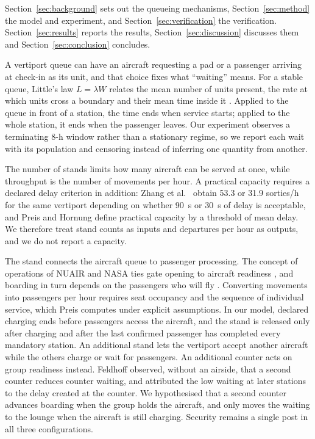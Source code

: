 \documentclass[12pt,a4paper]{article}
\makeatletter
\renewcommand\section{\@startsection{section}{1}{\z@}{12pt}{4pt}{\fontsize{14}{20}\selectfont\bfseries}}
\makeatother
\begin{document}
Section~\ref{sec:background} sets out the queueing mechanisms, Section~\ref{sec:method} the model
and experiment, and Section~\ref{sec:verification} the verification. Section~\ref{sec:results}
reports the results, Section~\ref{sec:discussion} discusses them and Section~\ref{sec:conclusion}
concludes.

\section{Queueing Mechanisms At A Passenger Vertiport}
\label{sec:background}

A vertiport queue can have an aircraft requesting a pad or a passenger arriving at check-in as
its unit, and that choice fixes what ``waiting'' means. For a stable queue, Little's law
$L=\lambda W$ relates the mean number of units present, the rate at which units cross a boundary
and their mean time inside it \cite{little1961}. Applied to the queue in front of a station, the
time ends when service starts; applied to the whole station, it ends when the passenger leaves. Our
experiment observes a terminating 8-h window rather than a stationary regime, so we report each
wait with its population and censoring instead of inferring one quantity from another.

The number of stands limits how many aircraft can be served at once, while throughput is the number
of movements per hour. A practical capacity requires a declared delay criterion in addition: Zhang
et al.\ \cite{zhang2023capacity} obtain 53.3 or 31.9 sorties/h for the same vertiport depending on
whether 90~s or 30~s of delay is acceptable, and Preis and Hornung \cite{preisHornung2022heuristic}
define practical capacity by a threshold of mean delay. We therefore treat stand counts as inputs
and departures per hour as outputs, and we do not report a capacity.

The stand connects the aircraft queue to passenger processing. The concept of operations of NUAIR
and NASA ties gate opening to aircraft readiness \cite{kunchulia2021}, and boarding in turn depends
on the passengers who will fly \cite{saxena2025vertiminal}. Converting movements into passengers per
hour requires seat occupancy and the sequence of individual service, which Preis \cite{preis2023}
computes under explicit assumptions. In our model, declared charging ends before passengers access
the aircraft, and the stand is released only after charging and after the last confirmed passenger
has completed every mandatory station. An additional stand lets the vertiport accept another
aircraft while the others charge or wait for passengers. An additional counter acts on group
readiness instead. Feldhoff \cite{feldhoff2022} observed, without an airside, that a second counter
reduces counter waiting, and attributed the low waiting at later stations to the delay created at
the counter. We hypothesised that a second counter advances boarding when the group holds the
aircraft, and only moves the waiting to the lounge when the aircraft is still charging. Security remains a single post in all three configurations.
\end{document}

